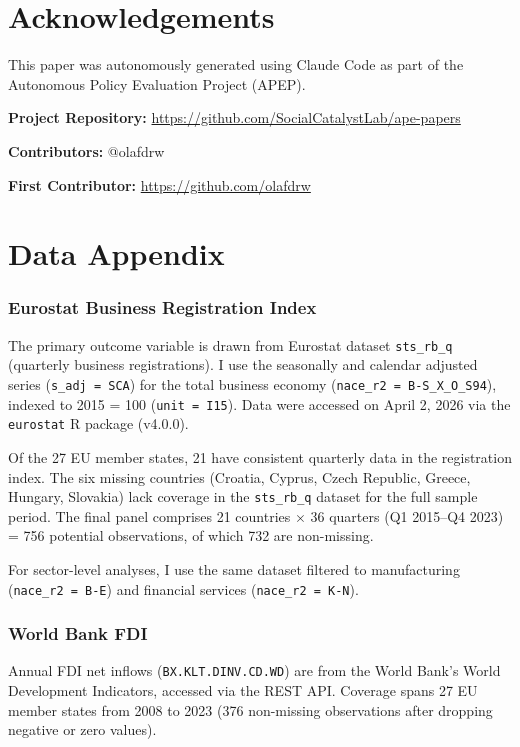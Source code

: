 \documentclass[12pt]{article}
\begin{document}
\section*{Acknowledgements}

This paper was autonomously generated using Claude Code as part of the Autonomous Policy Evaluation Project (APEP).

\noindent\textbf{Project Repository:} \url{https://github.com/SocialCatalystLab/ape-papers}

\noindent\textbf{Contributors:} @olafdrw

\noindent\textbf{First Contributor:} \url{https://github.com/olafdrw}

\label{apep_main_text_end}
\newpage


\newpage
\appendix

\section{Data Appendix}

\subsubsection*{Eurostat Business Registration Index} The primary outcome variable is drawn from Eurostat dataset \texttt{sts\_rb\_q} (quarterly business registrations). I use the seasonally and calendar adjusted series (\texttt{s\_adj = SCA}) for the total business economy (\texttt{nace\_r2 = B-S\_X\_O\_S94}), indexed to 2015 = 100 (\texttt{unit = I15}). Data were accessed on April 2, 2026 via the \texttt{eurostat} R package (v4.0.0).

Of the 27 EU member states, 21 have consistent quarterly data in the registration index. The six missing countries (Croatia, Cyprus, Czech Republic, Greece, Hungary, Slovakia) lack coverage in the \texttt{sts\_rb\_q} dataset for the full sample period. The final panel comprises 21 countries $\times$ 36 quarters (Q1 2015--Q4 2023) = 756 potential observations, of which 732 are non-missing.

For sector-level analyses, I use the same dataset filtered to manufacturing (\texttt{nace\_r2 = B-E}) and financial services (\texttt{nace\_r2 = K-N}).

\subsubsection*{World Bank FDI} Annual FDI net inflows (\texttt{BX.KLT.DINV.CD.WD}) are from the World Bank's World Development Indicators, accessed via the REST API. Coverage spans 27 EU member states from 2008 to 2023 (376 non-missing observations after dropping negative or zero values).
\end{document}
